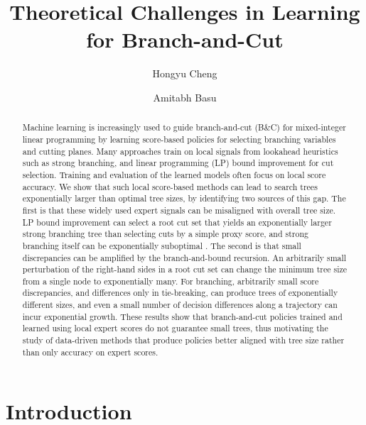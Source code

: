 \documentclass[smallextended,envcountsect]{svjour3} %
\title{Theoretical Challenges in Learning for Branch-and-Cut}
\date{}
\author{Hongyu Cheng \and Amitabh Basu}
\institute{Department of Applied Mathematics \& Statistics, Johns Hopkins University, Baltimore, MD 21218, USA\\
\email{hongyucheng@jhu.edu}\\
\email{basu.amitabh@jhu.edu}}
\newcommand{\0}{\mathbf{0}}
\newcommand{\1}{\mathbf{1}} %
\begin{document}
\maketitle

\begin{abstract}
	Machine learning is increasingly used to guide branch-and-cut (B\&C) for mixed-integer linear programming by learning score-based policies for selecting branching variables and cutting planes. Many approaches train on local signals from lookahead heuristics such as strong branching, and linear programming (LP) bound improvement for cut selection. Training and evaluation of the learned models often focus on local score accuracy. We show that such local score-based methods can lead to search trees exponentially larger than optimal tree sizes, by identifying two sources of this gap. The first is that these widely used expert signals can be misaligned with overall tree size. LP bound improvement can select a root cut set that yields an exponentially larger strong branching tree than selecting cuts by a simple proxy score, and strong branching itself can be exponentially suboptimal \citep{dey2024theoretical}. The second is that small discrepancies can be amplified by the branch-and-bound recursion. An arbitrarily small perturbation of the right-hand sides in a root cut set can change the minimum tree size from a single node to exponentially many. For branching, arbitrarily small score discrepancies, and differences only in tie-breaking, can produce trees of exponentially different sizes, and even a small number of decision differences along a trajectory can incur exponential growth. These results show that branch-and-cut policies trained and learned using local expert scores do not guarantee small trees, thus motivating the study of data-driven methods that produce policies better aligned with tree size rather than only accuracy on expert scores.
\end{abstract}

\section{Introduction}\label{sec:intro}
\end{document}

